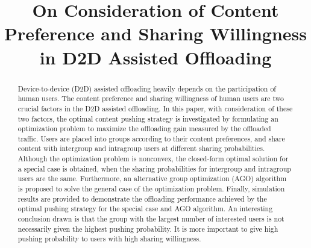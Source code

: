 \documentclass[12pt, draftclsnofoot, onecolumn]{IEEEtran}
\begin{document}
\title{On Consideration of Content Preference and Sharing Willingness in D2D Assisted Offloading}

\author{}
\maketitle

\begin{abstract}
Device-to-device (D2D) assisted offloading heavily depends on the participation of human users. The content preference and sharing willingness of human users are two crucial factors in the D2D assisted offloading. In this paper, with consideration of these two factors, the optimal content pushing strategy is investigated by formulating an optimization problem to maximize the offloading gain measured by the offloaded traffic. Users are placed into groups according to their content preferences, and share content with intergroup and intragroup users at different sharing probabilities. Although the optimization problem is nonconvex, the closed-form optimal solution for a special case is obtained, when the sharing probabilities for intergroup and intragroup users are the same. Furthermore, an alternative group optimization (AGO) algorithm is proposed to solve the general case of the optimization problem. Finally, simulation results are provided to demonstrate the offloading performance achieved by the optimal pushing strategy for the special case and AGO algorithm. An interesting conclusion drawn is that the group with the largest number of interested users is not necessarily given the highest pushing probability. It is more important to give high pushing probability to users with high sharing willingness.
\end{abstract}
\end{document}
